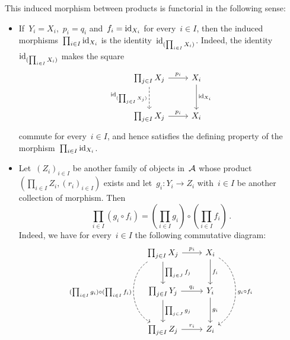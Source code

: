 \begin{remark*}
\begin{enumerate}
      This induced morphism between products is functorial in the following sense:
      \begin{itemize}
        \item
          If~$Y_i = X_i$,~$p_i = q_i$ and~$f_i = \operatorname{id}_{X_i}$ for every~$i \in I$, then the induced morphisms~$\prod_{i \in I} \operatorname{id}_{X_i}$ is the identity~$\operatorname{id}_{(\prod_{i \in I} X_i)}$.
          Indeed, the identity~$\operatorname{id}_{(\prod_{i \in I} X_i)}$ makes the square
          \[
            \begin{tikzcd}[row sep = large]
                \prod_{j \in I} X_j
                \arrow{r}[above]{p_i}
                \arrow[dashed]{d}[left]{\id_{(\prod_{j \in I} X_j)}}
              & X_i
                \arrow{d}[right]{\id_{X_i}}
              \\
                \prod_{j \in I} X_j
                \arrow{r}[above]{p_i}
              & X_i
            \end{tikzcd}
          \]
          commute for every~$i \in I$, and hence satisfies the defining property of the morphism~$\prod_{i \in I} \operatorname{id}_{X_i}$.
        \item
          Let~$(Z_i)_{i \in I}$ be another family of objects in~$\mathcal{A}$ whose product~$(\prod_{i \in I} Z_i, (r_i)_{i \in I})$ exists and let~$g_i \colon Y_i \to Z_i$ with~$i \in I$ be another collection of morphism.
          Then
          \[
              \prod_{i \in I} (g_i \circ f_i)
            =       \left( \prod_{i \in I} g_i \right)
              \circ \left( \prod_{i \in I} f_i \right) \,.
          \]
          Indeed, we have for every~$i \in I$ the following commutative diagram:
          \[
            \begin{tikzcd}[row sep = large]
                \prod_{j \in I} X_j
                \arrow{r}[above]{p_i}
                \arrow{d}[right]{\prod_{j \in J} f_j}
                \arrow[dashed, bend right = 60]{dd}[left]{(\prod_{i \in I} g_i) \circ (\prod_{i \in I} f_i)}
              & X_i
                \arrow{d}[right]{f_i}
                \arrow[dashed, bend left = 60]{dd}[right]{g_i \circ f_i}
              \\
                \prod_{j \in I} Y_j
                \arrow{r}[above]{q_i}
                \arrow{d}[right]{\prod_{j \in J} g_j}
              & Y_i
                \arrow{d}[right]{g_i}
              \\
                \prod_{j \in I} Z_j
                \arrow{r}[above]{r_i}
              & Z_i
            \end{tikzcd}
          \]

\end{itemize}
\end{enumerate}
\end{remark*}
